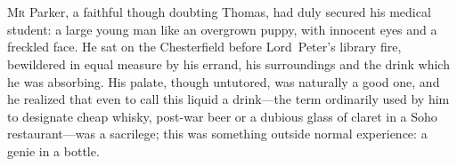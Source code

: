 \chapter[Chapter \thechapter]{}
\lettrine[lines=4]{M}{r} Parker, a faithful though doubting Thomas, had duly secured his medical student: a large young man like an overgrown puppy, with innocent eyes and a freckled face. He sat on the Chesterfield before Lord~Peter's library fire, bewildered in equal measure by his errand, his surroundings and the drink which he was absorbing. His palate, though untutored, was naturally a good one, and he realized that even to call this liquid a drink—the term ordinarily used by him to designate cheap whisky, post-war beer or a dubious glass of claret in a Soho restaurant—was a sacrilege; this was something outside normal experience: a genie in a bottle.

